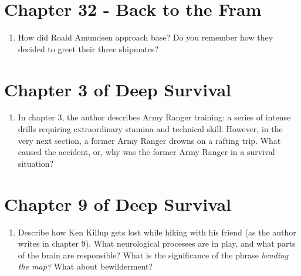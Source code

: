\documentclass{article}
\begin{document}
\section{Chapter 32 - Back to the Fram}
\begin{enumerate}
\item How did Roald Amundsen approach base?  Do you remember how they decided to greet their three shipmates? \\ \vspace{1cm}
\end{enumerate}

\section{Chapter 3 of Deep Survival}

\begin{enumerate}
\item In chapter 3, the author describes Army Ranger training: a series of intense drills requiring extraordinary stamina and technical skill.  However, in the very next section, a former Army Ranger drowns on a rafting trip.  What caused the accident, or, why was the former Army Ranger in a survival situation? \\ \vspace{1.5cm}
\end{enumerate}

\section{Chapter 9 of Deep Survival}
\begin{enumerate}
\item Describe how Ken Killup gets lost while hiking with his friend (as the author writes in chapter 9).  What neurological processes are in play, and what parts of the brain are responsible?  What is the significance of the phrase \textit{bending the map?}  What about bewilderment?
\end{enumerate}
\end{document}
